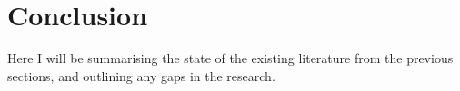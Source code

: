 \section{Conclusion}
\label{lr:conclusion}
Here I will be summarising the state of the existing literature from the previous sections, and outlining any gaps in the research.

%	
%	
%	
%	
